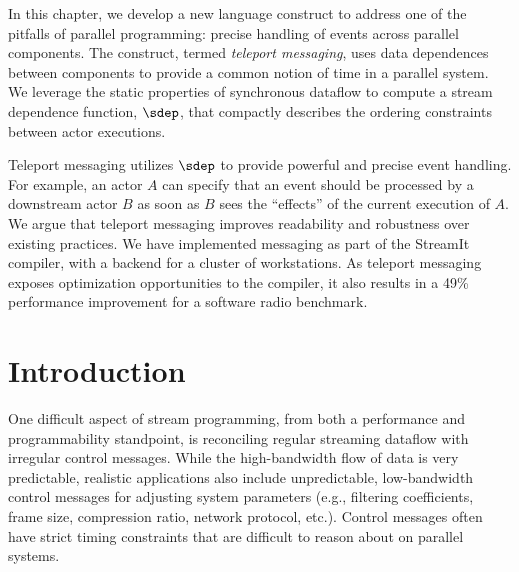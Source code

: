 
\label{chap:messaging}

\newtheorem{definition}{Definition}
\newtheorem{theorem}{Theorem}

\newcommand{\floor}[2]{\left\lfloor\frac{#1}{#2}\right\rfloor}
\newcommand{\ceil}[2]{\left\lceil\frac{#1}{#2}\right\rceil}

\newcommand{\todo}[1]{\framebox{\bf #1}}
\newcommand{\naive}[0]{na\"{\i}ve}
\newcommand{\Naive}[0]{Na\"{\i}ve}
\newcommand{\makeline}[0]{\rule{0cm}{0cm}\\\hrule\rule{0cm}{0cm}}

In this chapter, we develop a new language construct to address one of
the pitfalls of parallel programming: precise handling of events
across parallel components.  The construct, termed {\it teleport
  messaging}, uses data dependences between components to provide a
common notion of time in a parallel system.  We leverage the static
properties of synchronous dataflow to compute a stream dependence
function, $\sdep$, that compactly describes the ordering constraints
between actor executions.

Teleport messaging utilizes $\sdep$ to provide powerful and precise
event handling.  For example, an actor $A$ can specify that an event
should be processed by a downstream actor $B$ as soon as $B$ sees the
``effects'' of the current execution of $A$.  We argue that teleport
messaging improves readability and robustness over existing practices.
We have implemented messaging as part of the StreamIt compiler, with a
backend for a cluster of workstations.  As teleport messaging exposes
optimization opportunities to the compiler, it also results in a 49\%
performance improvement for a software radio benchmark.

\section{Introduction}

One difficult aspect of stream programming, from both a performance
and programmability standpoint, is reconciling regular streaming
dataflow with irregular control messages.  While the high-bandwidth
flow of data is very predictable, realistic applications also include
unpredictable, low-bandwidth control messages for adjusting system
parameters (e.g., filtering coefficients, frame size, compression
ratio, network protocol, etc.).  Control messages often have strict
timing constraints that are difficult to reason about on parallel
systems.


